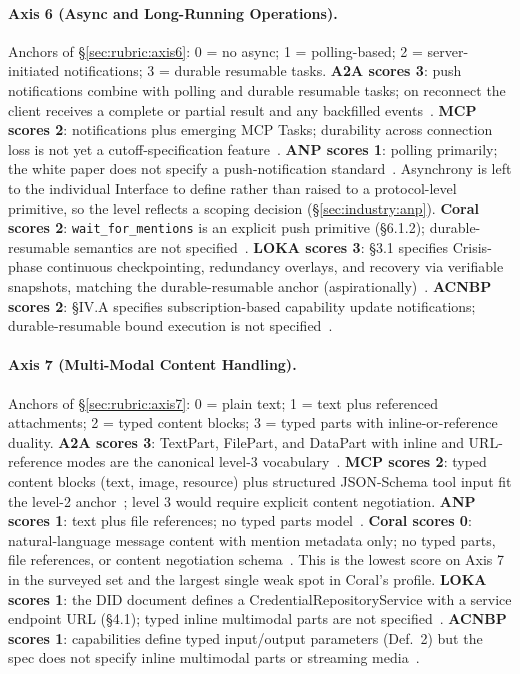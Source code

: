 \paragraph{Axis 6 (Async and Long-Running Operations).}
Anchors of \S\ref{sec:rubric:axis6}: 0 = no async; 1 =
polling-based; 2 = server-initiated notifications; 3 =
durable resumable tasks. \textbf{A2A scores 3}: push
notifications combine with polling and durable resumable
tasks; on reconnect the client receives a complete or
partial result and any backfilled events~\cite{spec_a2a}.
\textbf{MCP scores 2}: notifications plus emerging MCP
Tasks; durability across connection loss is not yet a
cutoff-specification feature~\cite{spec_mcp}. \textbf{ANP
scores 1}: polling primarily; the white paper does not
specify a push-notification standard~\cite{spec_anp}.
Asynchrony is left to the individual Interface to define
rather than raised to a protocol-level primitive, so the
level reflects a scoping decision
(\S\ref{sec:industry:anp}).
\textbf{Coral scores 2}: \texttt{wait\_for\_mentions} is
an explicit push primitive (\S6.1.2); durable-resumable
semantics are not specified~\cite{spec_coral}.
\textbf{LOKA scores 3}: \S3.1 specifies Crisis-phase
continuous checkpointing, redundancy overlays, and
recovery via verifiable snapshots, matching the
durable-resumable anchor (aspirationally)~\cite{spec_loka}.
\textbf{ACNBP scores 2}: \S IV.A specifies
subscription-based capability update notifications;
durable-resumable bound execution is not
specified~\cite{spec_acnbp}.

\paragraph{Axis 7 (Multi-Modal Content Handling).}
Anchors of \S\ref{sec:rubric:axis7}: 0 = plain text;
1 = text plus referenced attachments; 2 = typed content
blocks; 3 = typed parts with inline-or-reference duality.
\textbf{A2A scores 3}: TextPart, FilePart, and DataPart
with inline and URL-reference modes are the canonical
level-3 vocabulary~\cite{spec_a2a}. \textbf{MCP scores
2}: typed content blocks (text, image, resource) plus
structured JSON-Schema tool input fit the level-2
anchor~\cite{spec_mcp}; level 3 would require explicit
content negotiation. \textbf{ANP scores 1}: text plus
file references; no typed parts model~\cite{spec_anp}.
\textbf{Coral scores 0}: natural-language message content
with mention metadata only; no typed parts, file
references, or content negotiation
schema~\cite{spec_coral}. This is the lowest score on
Axis 7 in the surveyed set and the largest single weak
spot in Coral's profile. \textbf{LOKA scores 1}: the
DID document defines a CredentialRepositoryService with
a service endpoint URL (\S4.1); typed inline multimodal
parts are not specified~\cite{spec_loka}. \textbf{ACNBP
scores 1}: capabilities define typed input/output
parameters (Def.~2) but the spec does not specify
inline multimodal parts or streaming media~\cite{spec_acnbp}.

